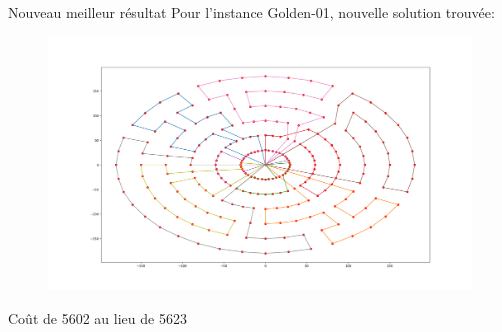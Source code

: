 \documentclass{beamer}
\begin{document}
\begin{frame}{Nouveau meilleur résultat}
Pour l'instance Golden-01, nouvelle solution trouvée:

\begin{figure}
\centering
\includegraphics[scale=0.2]{NewBestG01}
\end{figure}

Coût de 5602 au lieu de 5623
\end{frame}
\end{document}
